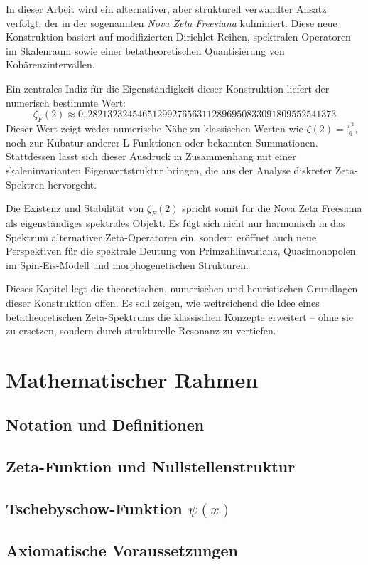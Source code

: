 \documentclass[12pt]{article}
\begin{document}
In dieser Arbeit wird ein alternativer, aber strukturell verwandter Ansatz verfolgt, der in der sogenannten \textit{Nova Zeta Freesiana} kulminiert. Diese neue Konstruktion basiert auf modifizierten Dirichlet-Reihen, spektralen Operatoren im Skalenraum sowie einer betatheoretischen Quantisierung von Kohärenzintervallen.

Ein zentrales Indiz für die Eigenständigkeit dieser Konstruktion liefert der numerisch bestimmte Wert:
\[
\zeta_F(2) \approx 0{,}28213232454651299276563112896950833091809552541373
\]
Dieser Wert zeigt weder numerische Nähe zu klassischen Werten wie \( \zeta(2) = \frac{\pi^2}{6} \), noch zur Kubatur anderer L-Funktionen oder bekannten Summationen. Stattdessen lässt sich dieser Ausdruck in Zusammenhang mit einer skaleninvarianten Eigenwertstruktur bringen, die aus der Analyse diskreter Zeta-Spektren hervorgeht.

Die Existenz und Stabilität von \( \zeta_F(2) \) spricht somit für die Nova Zeta Freesiana als eigenständiges spektrales Objekt. Es fügt sich nicht nur harmonisch in das Spektrum alternativer Zeta-Operatoren ein, sondern eröffnet auch neue Perspektiven für die spektrale Deutung von Primzahlinvarianz, Quasimonopolen im Spin-Eis-Modell und morphogenetischen Strukturen.

Dieses Kapitel legt die theoretischen, numerischen und heuristischen Grundlagen dieser Konstruktion offen. Es soll zeigen, wie weitreichend die Idee eines betatheoretischen Zeta-Spektrums die klassischen Konzepte erweitert – ohne sie zu ersetzen, sondern durch strukturelle Resonanz zu vertiefen.

\section{Mathematischer Rahmen}
\subsection{Notation und Definitionen}
\subsection{Zeta-Funktion und Nullstellenstruktur}
\subsection{Tschebyschow-Funktion \texorpdfstring{$\psi(x)$}{psi(x)}}
\subsection{Axiomatische Voraussetzungen}
\end{document}
